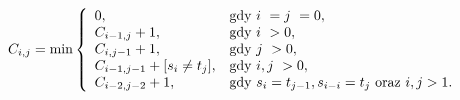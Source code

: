 \documentclass{praca1}
\begin{document}
\begin{equation}
\label{eq:007}
C_{i,j} = \min\left\{
\begin{array}{l l}     
    0, & \text{gdy } i~= j~= 0,\\
    C_{i-1, j} + 1, & \text{gdy } i~> 0, \\
    C_{i, j-1} + 1, & \text{gdy } j~> 0, \\
    C_{i-1, j-1} + [s_{i}\neq t_{j}], & \text{gdy } i, j~> 0, \\
    C_{i-2, j-2} + 1, & \text{gdy } s_i = t_{j-1}, s_{i-i} = t_j \text{ oraz } i,j > 1.
\end{array}\right.
\end{equation}


%

\end{document}

